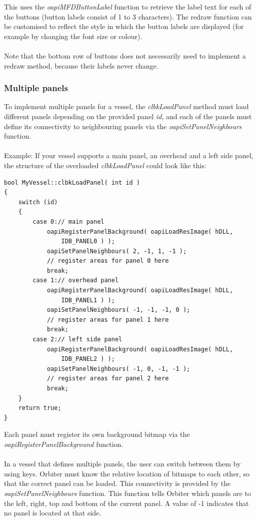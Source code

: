 \documentclass[Orbiter Developer Manual.tex]{subfiles}
\begin{document}
\noindent
This uses the \textit{oapiMFDButtonLabel} function to retrieve the label text for each of the buttons (button labels consist of 1 to 3 characters). The redraw function can be customised to reflect the style in which the button labels are displayed (for example by changing the font size or colour).\\
\\
Note that the bottom row of buttons does not necessarily need to implement a redraw method, because their labels never change.


\subsubsection{Multiple panels}
To implement multiple panels for a vessel, the \textit{clbkLoadPanel} method must load different panels depending on the provided panel \textit{id}, and each of the panels must define its connectivity to neighbouring panels via the \textit{oapiSetPanelNeighbours} function.\\
\\
Example: If your vessel supports a main panel, an overhead and a left side panel, the structure of the overloaded \textit{clbkLoadPanel} could look like this:

\begin{lstlisting}
bool MyVessel::clbkLoadPanel( int id )
{
	switch (id)
	{
		case 0:// main panel
			oapiRegisterPanelBackground( oapiLoadResImage( hDLL,
				IDB_PANEL0 ) );
			oapiSetPanelNeighbours( 2, -1, 1, -1 );
			// register areas for panel 0 here
			break;
		case 1:// overhead panel
			oapiRegisterPanelBackground( oapiLoadResImage( hDLL,
				IDB_PANEL1 ) );
			oapiSetPanelNeighbours( -1, -1, -1, 0 );
			// register areas for panel 1 here
			break;
		case 2:// left side panel
			oapiRegisterPanelBackground( oapiLoadResImage( hDLL,
				IDB_PANEL2 ) );
			oapiSetPanelNeighbours( -1, 0, -1, -1 );
			// register areas for panel 2 here
			break;
	}
	return true;
}
\end{lstlisting}

\noindent
Each panel must register its own background bitmap via the \textit{oapiRegisterPanelBackground} function.\\
\\
In a vessel that defines multiple panels, the user can switch between them by using \Ctrl\DArrow\UArrow\RArrow\LArrow keys. Orbiter must know the relative location of bitmaps to each other, so that the correct panel can be loaded. This connectivity is provided by the \textit{oapiSetPanelNeighbours} function. This function tells Orbiter which panels are to the left, right, top and bottom of the current panel. A value of -1 indicates that no panel is located at that side.
\end{document}
